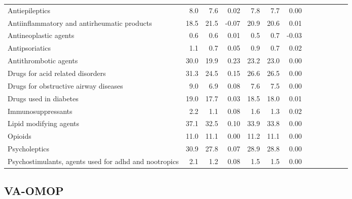 \documentclass[11pt,]{article}
\begin{document}
\begin{longtable}{lrrrrrrrrrrrr}
      Antiepileptics &  8.0 &  7.6 &  0.02 &   7.8 &  7.7 &  0.00 \\ 
      Antiinflammatory and antirheumatic products & 18.5 & 21.5 & -0.07 &  20.9 & 20.6 &  0.01 \\ 
      Antineoplastic agents &  0.6 &  0.6 &  0.01 &   0.5 &  0.7 & -0.03 \\ 
      Antipsoriatics &  1.1 &  0.7 &  0.05 &   0.9 &  0.7 &  0.02 \\ 
      Antithrombotic agents & 30.0 & 19.9 &  0.23 &  23.2 & 23.0 &  0.00 \\ 
      Drugs for acid related disorders & 31.3 & 24.5 &  0.15 &  26.6 & 26.5 &  0.00 \\ 
      Drugs for obstructive airway diseases &  9.0 &  6.9 &  0.08 &   7.6 &  7.5 &  0.00 \\ 
      Drugs used in diabetes & 19.0 & 17.7 &  0.03 &  18.5 & 18.0 &  0.01 \\ 
      Immunosuppressants &  2.2 &  1.1 &  0.08 &   1.6 &  1.3 &  0.02 \\ 
      Lipid modifying agents & 37.1 & 32.5 &  0.10 &  33.9 & 33.8 &  0.00 \\ 
      Opioids & 11.0 & 11.1 &  0.00 &  11.2 & 11.1 &  0.00 \\ 
      Psycholeptics & 30.9 & 27.8 &  0.07 &  28.9 & 28.8 &  0.00 \\ 
      Psychostimulants, agents used for adhd and nootropics &  2.1 &  1.2 &  0.08 &   1.5 &  1.5 &  0.00 \\ 
   \bottomrule\end{longtable}
\clearpage

\hypertarget{va-omop}{%
\subsection{VA-OMOP}\label{va-omop}}
\end{document}
